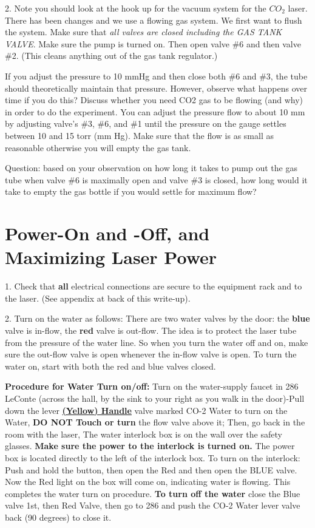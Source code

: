 \documentclass{../lab}
\begin{document}
2. Note you should look at the hook up for the vacuum system for the $CO_2 $ laser. There has been changes and we use a flowing gas system. We first want to flush the system. Make sure that \emph{all valves are closed including the GAS TANK VALVE}. Make sure the pump is turned on. Then open valve \#6 and then valve \#2. (This cleans anything out of the gas tank regulator.)

If you adjust the pressure to 10 mmHg and then close both \#6 and \#3, the tube should theoretically maintain that pressure. However, observe what happens over time if you do this? Discuss whether you need CO2 gas to be flowing (and why) in order to do the experiment. You can adjust the pressure flow to about 10 mm by adjusting valve's \#3, \#6, and \#1 until the pressure on the gauge settles between 10 and 15 torr (mm Hg). Make sure that the flow is as small as reasonable otherwise you will empty the gas tank.

Question: based on your observation on how long it takes to pump out the gas tube when valve \#6 is maximally open and valve \#3 is closed, how long would it take to empty the gas bottle if you would settle for maximum flow?

\section{Power-On and -Off, and Maximizing Laser Power}

1. Check that \textbf{all} electrical connections are secure to the equipment rack and to the laser. (See appendix at back of this write-up).

2. Turn on the water as follows: There are two water valves by the door: the \textbf{blue} valve is in-flow, the \textbf{red }valve is out-flow. The idea is to protect the laser tube from the pressure of the water line. So when you turn the water off and on, make sure the out-flow valve is open whenever the in-flow valve is open. To turn the water on, start with both the red and blue valves closed.

\textbf{Procedure for Water Turn on/off:} Turn on the water-supply faucet in 286 LeConte (across the hall, by the sink to your right as you walk in the door)-Pull down the lever \href{http://advancedlab.berkeley.edu/mediawiki/images/7/70/CO2\_Water\_3529.jpg}{\textbf{(Yellow) Handle}} valve marked CO-2 Water to turn on the Water, \textbf{DO NOT Touch or turn }the flow valve above it; Then, go back in the room with the laser, The water interlock box is on the wall over the safety glasses. \textbf{Make sure the power to the interlock is turned on.} The power box is located directly to the left of the interlock box. To turn on the interlock: Push and hold the button, then open the Red and then open the BLUE valve. Now the Red light on the box will come on, indicating water is flowing. This completes the water turn on procedure. \textbf{To turn off the water} close the Blue valve 1st, then Red Valve, then go to 286 and push the CO-2 Water lever valve back (90 degrees) to close it.
\end{document}
